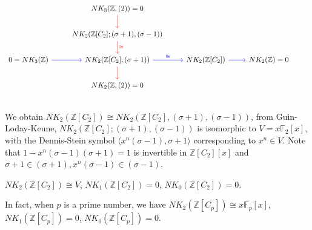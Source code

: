 \[\begin{tikzcd}
	 & NK_3(\mathbb{Z},(2))=0 \ar[d,red] & & & \\
	 & NK_2(\mathbb{Z}[C_2];(\sigma+1),(\sigma-1)) \ar[d,red,"\cong",red] \\
0=NK_3(\mathbb{Z})	\ar[r,blue] & NK_2(\mathbb{Z}[C_2],(\sigma+1)) \ar[r,blue,"\cong",blue] \ar[d,red] & NK_2(\mathbb{Z}[C_2]) \ar[r,blue] &NK_2(\mathbb{Z})=0\\
	& NK_2(\mathbb{Z},(2))=0 \\
\end{tikzcd}
\]
We obtain $NK_2(\mathbb{Z}[C_2])\cong NK_2(\mathbb{Z}[C_2],(\sigma+1),(\sigma-1))$, from Guin-Loday-Keune\cite{Guin-Waléry1981}, $NK_2(\mathbb{Z}[C_2];(\sigma+1),(\sigma-1))$ is isomorphic to $V=x \mathbb{F}_2[x]$, with the Dennis-Stein symbol $\langle x^n(\sigma-1),\sigma+1 \rangle$ corresponding to $x^n\in V$. Note that $1-x^n(\sigma-1)(\sigma+1)=1$ is invertible in $\mathbb{Z}[C_2][x]$ and $\sigma+1 \in (\sigma+1), x^n(\sigma-1) \in (\sigma-1)$.

\begin{theorem}
	$NK_2(\mathbb{Z}[C_2])\cong V$, $NK_1(\mathbb{Z}[C_2])=0$, $NK_0(\mathbb{Z}[C_2])=0$.
\end{theorem}

In fact, when $p$ is a prime number, we have $NK_2(\mathbb{Z}[C_p])\cong x \mathbb{F}_p[x]$, $NK_1(\mathbb{Z}[C_p])=0$, $NK_0(\mathbb{Z}[C_p])=0$.

